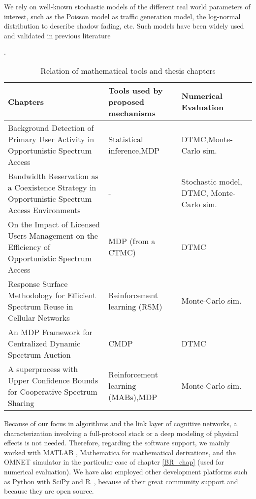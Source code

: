We rely on well-known stochastic models of the different real world parameters of interest, such as the Poisson model as traffic generation model, the log-normal distribution to describe shadow fading, etc. Such models have been widely used and validated in previous literature \cite{ref:Goldsmith2}
\begin{table}.
\begin{tabular}{|m{5cm}|H{3.5cm}|H{3.5cm}|} \hline
\textbf{Chapters} & \textbf{Tools used by proposed mechanisms} & \textbf{Numerical Evaluation}\\\hline
Background Detection of Primary User Activity in Opportunistic Spectrum Access & Statistical inference,\newline MDP & DTMC,\newline Monte-Carlo sim.\\\hline
Bandwidth Reservation as a Coexistence Strategy in Opportunistic Spectrum Access Environments & - & Stochastic model, DTMC, Monte-Carlo sim.\\\hline
On the Impact of Licensed Users Management on the Efficiency of Opportunistic Spectrum Access
 & MDP (from a CTMC) & DTMC \\\hline
Response Surface Methodology for Efficient Spectrum Reuse in Cellular Networks & Reinforcement learning (RSM) & Monte-Carlo sim.\\\hline
An MDP Framework for Centralized Dynamic Spectrum Auction & CMDP & DTMC \\\hline
A superprocess with Upper Confidence Bounds for Cooperative Spectrum Sharing & Reinforcement learning (MABs),\newline MDP & Monte-Carlo sim. \\\hline
\end{tabular}
\centering
\caption{Relation of mathematical tools and thesis chapters}
\label{intro_table_math_tools}
\end{table}


Because of our focus in algorithms and the link layer of cognitive networks, a characterization involving a full-protocol stack or a deep modeling of physical effects is not needed. Therefore, regarding the software support, we mainly worked with MATLAB \cite{ref:MATLAB}, Mathematica \cite{ref:Mathematica} for mathematical derivations, and the OMNET simulator \cite{ref:Omnet} in the particular case of chapter \ref{BR_chap} (used for numerical evaluation). We have also employed other development platforms such as Python with SciPy \cite{ref:SciPy} and R \cite{ref:RStudio}, because of their great community support and because they are open source.



